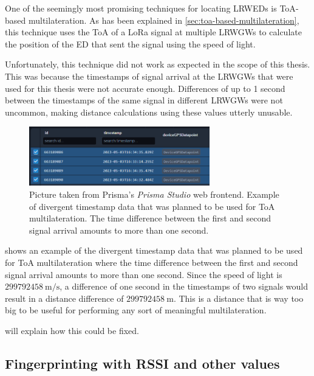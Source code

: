 One of the seemingly most promising techniques for locating \aclp{LRWED} is \ac{ToA}-based multilateration.
As has been explained in \cref{sec:toa-based-multilateration}, this technique uses the \acl{ToA} of a \ac{LoRa} signal at multiple \aclp{LRWGW} to calculate the position of the \acl{ED} that sent the signal using the speed of light.

Unfortunately, this technique did not work as expected in the scope of this thesis.
This was because the timestamps of signal arrival at the \aclp{LRWGW} that were used for this thesis were not accurate enough.
Differences of up to 1 second between the timestamps of the same signal in different \aclp{LRWGW} were not uncommon, making distance calculations using these values utterly unusable.

\begin{figure}[htbp]
    \centering
    \includegraphics[width=0.7\textwidth]{pictures/multilateration/toa_bad_data_example_prisma_studio.png}
    \caption{
        Picture taken from Prisma's \emph{Prisma Studio} web frontend.
        Example of divergent timestamp data that was planned to be used for \ac{ToA} multilateration.
        The time difference between the first and second signal arrival amounts to more than one second.
    }\label{fig:toa-bad-data-example}
\end{figure}

 shows an example of the divergent timestamp data that was planned to be used for \ac{ToA} multilateration where the time difference between the first and second signal arrival amounts to more than one second.
Since the speed of light is $299792458\ \mathrm{m/s}$, a difference of one second in the timestamps of two signals would result in a distance difference of $299792458\ \mathrm{m}$.
This is a distance that is way too big to be useful for performing any sort of meaningful multilateration.

 will explain how this could be fixed.

\subsection{Fingerprinting with \acs{RSSI} and other values}\label{sec:fingerprinting-implementation}

